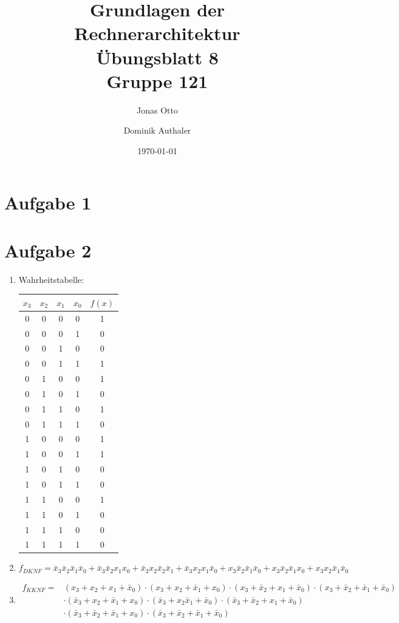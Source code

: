 \documentclass[a4paper]{article}
\title{Grundlagen der Rechnerarchitektur\\ Übungsblatt 8\\Gruppe 121\\}
\author{Jonas Otto\and Dominik Authaler}
\date{\today}
\begin{document}
\maketitle

\section*{Aufgabe 1}
\section*{Aufgabe 2}
\begin{enumerate}[label=\alph*)]
	\item Wahrheitstabelle: \\
	\begin{tabular}{cccc|c}
		$x_3$ & $x_2$ & $x_1$ & $x_0$ & $f(x)$ \\
		\hline
		0 & 0 & 0 & 0 & 1 \\
		0 & 0 & 0 & 1 & 0 \\
		0 & 0 & 1 & 0 & 0 \\
		0 & 0 & 1 & 1 & 1 \\
		0 & 1 & 0 & 0 & 1 \\
		0 & 1 & 0 & 1 & 0 \\
		0 & 1 & 1 & 0 & 1 \\
		0 & 1 & 1 & 1 & 0 \\
		1 & 0 & 0 & 0 & 1 \\
		1 & 0 & 0 & 1 & 1 \\
		1 & 0 & 1 & 0 & 0 \\
		1 & 0 & 1 & 1 & 0 \\
		1 & 1 & 0 & 0 & 1 \\
		1 & 1 & 0 & 1 & 0 \\
		1 & 1 & 1 & 0 & 0 \\
		1 & 1 & 1 & 1 & 0 \\
	\end{tabular}
	\item
	\begin{equation*}
		f_{DKNF} = \bar{x}_3\bar{x}_2\bar{x}_1\bar{x}_0 + \bar{x}_3\bar{x}_2x_1x_0 + \bar{x}_3 x_2 \bar{x}_2\bar{x}_1 + \bar{x}_3x_2x_1\bar{x}_0 + x_3\bar{x}_2\bar{x}_1\bar{x}_0 + x_3\bar{x}_2\bar{x}_1x_0 + x_3x_2\bar{x}_1\bar{x}_0 
	\end{equation*} 
	
	\item 
	\begin{align*}
	f_{KKNF} =  &(x_3 + x_2 + x_1 + \bar{x}_0) \cdot (x_3 + x_2 + \bar{x}_1 + x_0) \cdot (x_3 + \bar{x}_2 + x_1 + \bar{x}_0) \cdot (x_3 + \bar{x}_2 + \bar{x}_1 + \bar{x}_0) \\ &\cdot (\bar{x}_3 + x_2 + \bar{x}_1 + x_0) \cdot (\bar{x}_3 + x_2 \bar{x}_1 + \bar{x}_0) \cdot (\bar{x}_3 + \bar{x}_2 + x_1 +\bar{x}_0) \\ &\cdot (\bar{x}_3 + \bar{x}_2 + \bar{x}_1 + x_0) \cdot (\bar{x}_3 + \bar{x}_2 + \bar{x}_1 + \bar{x}_0)
	\end{align*}
	

\end{enumerate}
\end{document}
